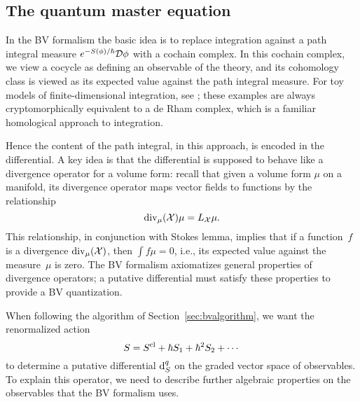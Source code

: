 

\subsection{The quantum master equation}

In the BV formalism the basic idea is to replace integration against a path integral measure $e^{-S(\phi)/\hbar} \mathcal D \phi$ with a cochain complex.
In this cochain complex, we view a cocycle as defining an observable of the theory,
and its cohomology class is viewed as its expected value against the path integral measure.
For toy models of finite-dimensional integration, see \cite{};
these examples are always cryptomorphically equivalent to a de Rham complex,
which is a familiar homological approach to integration.

Hence the content of the path integral, in this approach, is encoded in the differential. 
A key idea is that the differential is supposed to behave like a divergence operator for a volume form:
recall that given a volume form $\mu$ on a manifold, 
its divergence operator maps vector fields to functions by the relationship
\[
{\rm div}_\mu({\mathcal X}) \mu = L_{\mathcal X} \mu.
\] 
This relationship, in conjunction with Stokes lemma, 
implies that if a function~$f$ is a divergence ${\rm div}_\mu({\mathcal X})$,
then $\int f \mu = 0$,
i.e., its expected value against the measure~$\mu$ is zero.
The BV formalism axiomatizes general properties of divergence operators;
a putative differential must satisfy these properties to provide a BV quantization.

When following the algorithm of Section~\ref{sec:bvalgorithm},
we want the renormalized action
\[
S = S^{\rm cl} + \hbar S_1 + \hbar^2 S_2 + \cdots
\]
to determine a putative differential ${\rm d}^q_S$ on the graded vector space of observables.
To explain this operator, we need to describe further algebraic properties on the observables
that the BV formalism uses.

